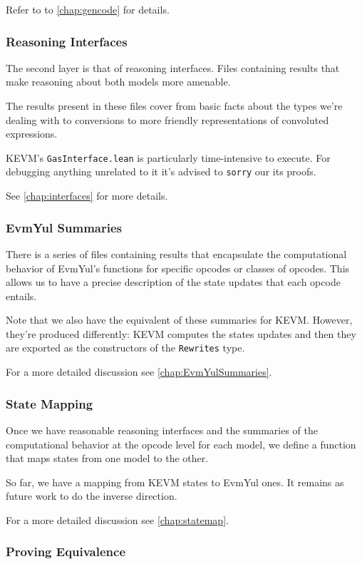 Refer to to \ref{chap:gencode} for details.

\subsubsection*{Reasoning Interfaces}

The second layer is that of reasoning interfaces. Files containing results that
make reasoning about both models more amenable.

The results present in these files cover from basic facts about the types we're
dealing with to conversions to more friendly representations of convoluted
expressions.

KEVM's \texttt{GasInterface.lean} is particularly time-intensive to execute. For
debugging anything unrelated to it it's advised to \texttt{sorry} our its
proofs.

See \ref{chap:interfaces} for more details.

\subsubsection*{EvmYul Summaries}

There is a series of files containing results that encapsulate the computational
behavior of EvmYul's functions for specific opcodes or classes of opcodes. This
allows us to have a precise description of the state updates that each opcode
entails.

Note that we also have the equivalent of these summaries for KEVM. However,
they're produced differently: KEVM computes the states updates and then they are
exported as the constructors of the \texttt{Rewrites} type.

For a more detailed discussion see \ref{chap:EvmYulSummaries}.

\subsubsection*{State Mapping}

Once we have reasonable reasoning interfaces and the summaries of the
computational behavior at the opcode level for each model, we define a function
that maps states from one model to the other.

So far, we have a mapping from KEVM states to EvmYul ones. It remains as future
work to do the inverse direction.

For a more detailed discussion see \ref{chap:statemap}.

\subsubsection*{Proving Equivalence}

